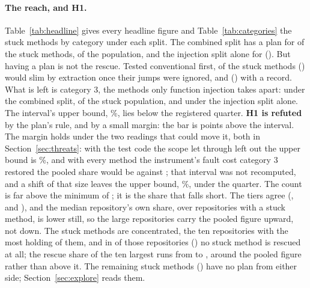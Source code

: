 \documentclass[11pt,a4paper]{article}
\newcommand{\Hone}{H1}
\begin{document}
\paragraph{The reach, and \Hone{}.} Table~\ref{tab:headline} gives every
headline figure and Table~\ref{tab:categories} the stuck methods by category
under each split. The combined split has a plan for \nStuckPlannedC{} of the
\nStuck{} stuck methods, \ciStuckPlannedC{} of the population, and the
injection split alone for \nStuckPlanned{} (\popStuckPlanned{}). But having a
plan is not the rescue. Tested conventional first, \catOne{} of the stuck
methods (\catOneShare{}) would slim by extraction once their jumps were
ignored, and \catTwo{} (\catTwoShare{}) with a record. What is left is
category 3, the methods only function injection takes apart: \catThreeC{}
under the combined split, \ciCatThreeC{} of the stuck population, and
\catThree{} under the injection split alone. The interval's upper bound,
\hiCatThreeC{}\%, lies below the registered quarter. \textbf{\Hone{} is
refuted} by the plan's rule, and by a small margin: the bar is \hOneBarGap{}
points above the interval. The margin holds under the two readings that
could move it, both in Section~\ref{sec:threats}: with the test code the
scope let through left out the upper bound is \testHOneHi{}\%, and with every
method the instrument's fault cost category 3 restored the pooled share would
be \catThreeCRestoredShare{} against \pooledCatThreeC{}; that interval was
not recomputed, and a shift of that size leaves the upper bound,
\hiCatThreeC{}\%, under the quarter. The count is far above
the minimum of \planHOneMinimum{}; it is the share that falls short. The
tiers agree (\tierHighCatThreeC{}, \tierMidCatThreeC{} and
\tierLowCatThreeC{}), and the median repository's own share,
\medianCatThreeC{} over \reposCatThreeC{} repositories with a stuck method,
is lower still, so the large repositories carry the pooled figure upward, not
down. The stuck methods are concentrated, the ten repositories with the most
holding \topTenShare{} of them, and in \reposStuckNoCatThree{} of those
\reposCatThreeC{} repositories (\reposStuckNoCatThreeShare{}) no stuck
method is rescued at all; the rescue share of the ten largest runs from
\topTenCatThreeCMin{} to \topTenCatThreeCMax{}, around the pooled figure
rather than above it. The remaining \catFourC{} stuck methods
(\catFourCShare{}) have no plan from either side;
Section~\ref{sec:explore} reads them.

\begin{table}[t]
\centering\small
\caption{The headline figures: the count over its denominator, the pooled share, the population estimate weighted by stratum with its \planLevel{} bootstrap interval over repositories within strata, and the median of each repository's own share over the repositories with a method in the denominator.}
\label{tab:headline}

\end{table}
\end{document}
